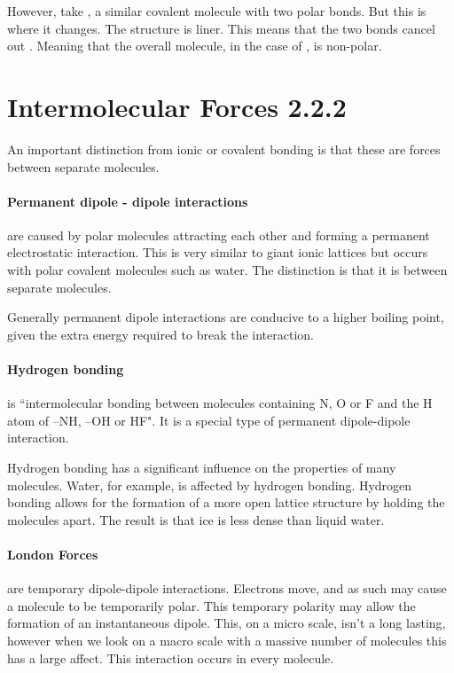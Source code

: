 	However, take , a similar covalent molecule with two  polar bonds. But this is where it changes. The structure is liner. This means that the two bonds cancel out . Meaning that the overall molecule, in the case of , is non-polar.
	
\section{Intermolecular Forces 2.2.2}
An important distinction from ionic or covalent bonding is that these are forces between separate molecules.

	\paragraph{Permanent dipole - dipole interactions} are caused by polar molecules attracting each other and forming a permanent electrostatic interaction. This is very similar to giant ionic lattices but occurs with polar covalent molecules such as water. The distinction is that it is between separate molecules.
	
	Generally permanent dipole interactions are conducive to a higher boiling point, given the extra energy required to break the interaction.
	
	\paragraph{Hydrogen bonding} is ``intermolecular bonding between molecules containing N, O or F and the H atom of –NH, –OH or HF". It is a special type of permanent dipole-dipole interaction. 
	
	Hydrogen bonding has a significant influence on the properties of many molecules. Water, for example, is affected by hydrogen bonding. Hydrogen bonding allows for the formation of a more open lattice structure by holding the molecules apart. The result is that ice is less dense than liquid water.
	
	\paragraph{London Forces} are temporary dipole-dipole interactions. Electrons move, and as such may cause a molecule to be temporarily polar. This temporary polarity may allow the formation of an instantaneous dipole. This, on a micro scale, isn't a long lasting, however when we look on a macro scale with a massive number of molecules this has a large affect. This interaction occurs in every molecule.
	
